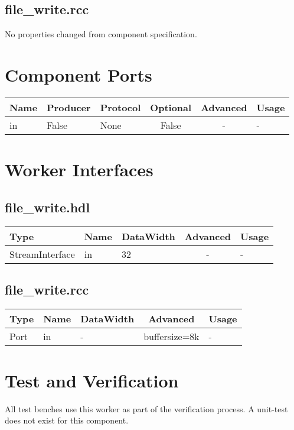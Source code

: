 \documentclass{article}
\def\comp{file\_write}
\begin{document}
\begin{landscape}
	\subsection*{\comp.rcc}
	\begin{scriptsize}
    No properties changed from component specification.
	\end{scriptsize}

	\section*{Component Ports}
	\begin{scriptsize}
\begin{tabular}{|M{2cm}|M{1.5cm}|M{4cm}|c|c|M{9cm}|}
\hline
{}
Name & Producer & Protocol & Optional & Advanced & Usage
\\
\hline
in & False & None& False & - & -\\
\hline
\end{tabular}
	\end{scriptsize}

	\section*{Worker Interfaces}
	\subsection*{\comp.hdl}
	\begin{scriptsize}
\begin{tabular}{|M{2cm}|M{1.5cm}|M{4cm}|c|M{12cm}|}
\hline
{}
Type & Name & DataWidth & Advanced & Usage
\\
\hline
StreamInterface & in & 32 & - & -\\
\hline
\end{tabular}
	\end{scriptsize}

	\subsection*{\comp.rcc}
	\begin{scriptsize}
\begin{tabular}{|M{2cm}|M{1.5cm}|M{4cm}|c|M{12cm}|}
\hline
{}
Type & Name & DataWidth & Advanced & Usage
\\
\hline
Port & in & - & buffersize=8k & -\\
\hline
\end{tabular}
	\end{scriptsize}
\end{landscape}

\section*{Test and Verification}
\begin{flushleft}
All test benches use this worker as part of the verification process. A unit-test does not exist for this component.
\end{flushleft}
\end{document}
